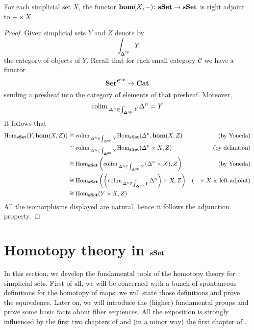 \begin{refsection}
\begin{prop} \label{prop sset cartesian closed}
For each simplicial set $X$, the functor $\mathbf{hom}(X,-) \colon \mathbf{sSet} \to \mathbf{sSet}$ is right adjoint to $- \times X$.
\end{prop}

\begin{proof}
Given simplicial sets $Y$ and $Z$ denote by
\[
\int_{\mathbf \Delta^{\mathrm{op}}} Y
\]
the category of objects of $Y$. Recall that for each small category $\mathcal C$ we have a functor
\[
\mathbf{Set}^{\mathcal C^{\mathrm{op}}} \to \mathbf{Cat}
\]
sending a presheaf into the category of elements of that presheaf. Moreover,
\[
\mathrm{colim} \,_{\Delta^n \in \int_{\mathbf \Delta^{\mathrm{op}}} Y} \Delta^n = Y
\]
It follows that
\begin{align*}
\mathrm{Hom}_{\mathbf{sSet}}(Y, \mathbf{hom}(X,Z)) & \cong \mathrm{colim} \,_{\Delta^n \in \int_{\mathbf \Delta^{\mathrm{op}}} Y} \mathrm{Hom}_{\mathbf{sSet}}(\Delta^n, \mathbf{hom}(X,Z) & \text{(by Yoneda)} \\
& \cong \mathrm{colim} \,_{\Delta^n \in \int_{\mathbf \Delta^{\mathrm{op}}} Y} \mathrm{Hom}_{\mathbf{sSet}} (\Delta^n \times X, Z) & \text{(by definition)} \\
& \cong \mathrm{Hom}_{\mathbf{sSet}} \left( \mathrm{colim} \,_{\Delta^n \in \int_{\mathbf \Delta^{\mathrm{op}}} Y} (\Delta^n \times X), Z \right) & \text{(by Yoneda)} \\
& \cong \mathrm{Hom}_{\mathbf{sSet}} \left( \left( \mathrm{colim} \,_{\Delta^n \in \int_{\mathbf \Delta^{\mathrm{op}}} Y} \Delta^n \right) \times X, Z \right) & \text{($- \times X$ is left adjoint)} \\
& \cong \mathrm{Hom}_{\mathbf{sSet}} (Y \times X, Z)
\end{align*}
All the isomorphisms displayed are natural, hence it follows the adjunction property.
\end{proof}


\section{Homotopy theory in \texorpdfstring{$\mathbf{sSet}$}{the category of simplicial sets}}

In this section, we develop the fundamental tools of the homotopy theory for simplicial sets. First of all, we will be concerned with a bunch of spontaneous definitions for the homotopy of maps; we will state those definitions and prove the equivalence. Later on, we will introduce the (higher) fundamental groups and prove some basic facts about fiber sequences. All the exposition is strongly influenced by the first two chapters of \cite{may} and (in a minor way) the first chapter of \cite{gj}.


\end{refsection}
